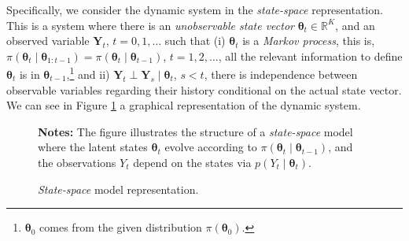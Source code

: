 Specifically, we consider the dynamic system in the \textit{state-space} representation. This is a system where there is an \textit{unobservable state vector} $\bm{\theta}_t\in\mathbb{R}^K$, and an observed variable $\bm{Y}_t$, $t=0,1,\dots$ such that (i) $\bm{\theta}_t$ is a \textit{Markov process}, this is, $\pi(\bm{\theta}_{t}\mid \bm{\theta}_{1:t-1})=\pi(\bm{\theta}_{t}\mid \bm{\theta}_{t-1})$, $t=1,2,\dots$, all the relevant information to define $\bm{\theta}_{t}$ is in $\bm{\theta}_{t-1}$,\footnote{$\bm{\theta}_{0}$ comes from the given distribution $\pi(\bm{\theta}_{0})$.} and ii) $\bm{Y}_t\perp \bm{Y}_s\mid \bm{\theta}_{t}$, $s<t$, there is independence between observable variables regarding their history conditional on the actual state vector. We can see in Figure \ref{fig:state_space} a graphical representation of the dynamic system.
\begin{figure}[h!]
\centering
\begin{tablenotes}
	\item \small{\textbf{Notes:} The figure illustrates the structure of a \textit{state-space} model where the latent states $\bm{\theta}_t$ evolve according to $\pi(\bm{\theta}_t \mid  \bm{\theta}_{t-1})$, and the observations $Y_t$ depend on the states via $p(Y_t \mid  \bm{\theta}_t)$.}
\end{tablenotes}
\caption{\textit{State-space} model representation.}
\label{fig:state_space}
\end{figure}

